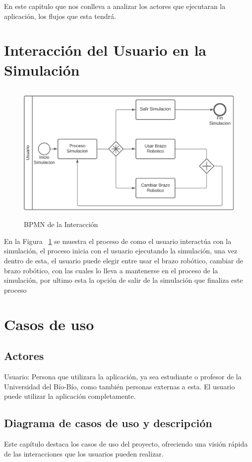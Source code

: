 En este capitulo que nos conlleva a analizar los actores que ejecutaran la aplicación, los flujos que esta tendrá.

\section{Interacción del Usuario en la Simulación}
\begin{figure}[ht]
\centering
\includegraphics[height=6.83cm]{figures/bpmn.png}
\caption{BPMN de la Interacción}
\label{fig:bpmn}
\end{figure}

En la Figura ~\ref{fig:bpmn} se muestra el proceso de como el usuario interactúa con la simulación, el proceso inicia con el usuario ejecutando la simulación, una vez dentro de esta, el usuario puede elegir entre usar el brazo robótico, cambiar de brazo robótico, con las cuales lo lleva a mantenerse en el proceso de la simulación, por ultimo esta la opción de salir de la simulación que finaliza este proceso

\section{Casos de uso}
\subsection{Actores}
Usuario: Persona que utilizara la aplicación, ya sea estudiante o profesor de la Universidad del Bío-Bío, como también personas externas a esta. El usuario puede utilizar la aplicación completamente.

\subsection{Diagrama de casos de uso y descripción}
Este capítulo destaca los casos de uso del proyecto, ofreciendo una visión rápida de las interacciones que los usuarios pueden realizar.


